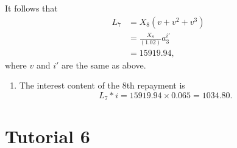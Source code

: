 \documentclass[
]{article}
\providecommand{\tightlist}{%
  \setlength{\itemsep}{0pt}\setlength{\parskip}{0pt}}
\theoremstyle{definition}
\theoremstyle{definition}
\theoremstyle{definition}
\theoremstyle{definition}
\theoremstyle{remark}
\begin{document}
It follows that
\[
\begin{aligned} L_7 &= X_8( v + v^2 + v^3) \\
&= \frac{X_8}{(1.02)} a^{i'}_3 \\
&= 15919.94,
\end{aligned}\]
where \(v\) and \(i'\) are the same as above.

\begin{enumerate}
\def\labelenumi{\arabic{enumi}.}
\setcounter{enumi}{2}
\tightlist
\item
  The interest content of the 8th repayment is
  \[ L_7 * i = 15919.94 \times 0.065 = 1034.80.\]
\end{enumerate}

\hypertarget{tutorial-6}{%
\section{Tutorial 6}\label{tutorial-6}}
\end{document}
